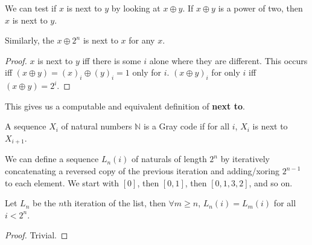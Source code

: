 \begin{theorem}
    \label{thm:next_to_xor_pow_two}
    We can test if $x$ is next to $y$ by looking at $x \oplus y$. If $x \oplus y$ is a
    power of two, then $x$ is next to $y$.

    Similarly, the $x \oplus 2^n$ is next to $x$ for any $x$.
\end{theorem}

\begin{proof}
    $x$ is next to $y$ iff there is some $i$ alone where they are different.
    This occurs iff $(x \oplus y) = (x)_i \oplus (y)_i = 1$ only for $i$.
    $(x \oplus y)_i$ for only $i$ iff $(x \oplus y) = 2^i$.
\end{proof}

\begin{definition}
    \label{def:computable_next_to}

    This gives us a computable and equivalent definition of \textbf{next to}.
\end{definition}

\begin{definition}
    \label{def:gray_code}
    A sequence $X_i$ of natural numbers $\mathbb{N}$ is a Gray code if
    for all $i$, $X_i$ is next to $X_{i+1}$.
\end{definition}

\begin{definition}
    \label{def:list_gray_code}

    We can define a sequence $L_n(i)$ of naturals of length $2^n$ by iteratively concatenating
    a reversed copy of the previous iteration and adding/xoring $2^{n-1}$ to each element.
    We start with $[0]$, then $[0, 1]$, then $[0, 1, 3, 2]$, and so on.
\end{definition}

\begin{theorem}
    \label{thm:list_is_stable}

    Let $L_n$ be the $n$th iteration of the list, then $\forall m \ge n$, $L_n(i) = L_m(i)$ for all $i < 2^n$.
\end{theorem}

\begin{proof}
    Trivial.
\end{proof}

